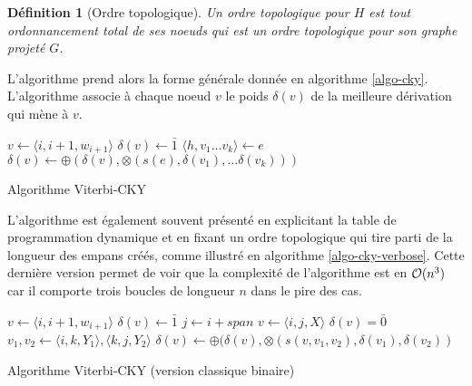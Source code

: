 \documentclass[11pt,openany]{book}
\newtheorem{definition}{Définition}[chapter]
\begin{document}
\begin{definition}[Ordre topologique]
Un ordre topologique pour $H$ est tout ordonnancement total de ses noeuds 
qui est un ordre topologique pour son graphe projeté $G$.
\end{definition}

L'algorithme prend alors la forme générale donnée en algorithme \ref{algo-cky}.
L'algorithme associe à chaque noeud $v$ le poids $\delta(v)$ de la meilleure dérivation qui mène à $v$.

\begin{algorithm}
\begin{algorithmic}[htbp]
\State $v \gets \langle i,i+1,w_{i+1} \rangle$
\State $\delta(v) \gets \bar{1}$
\EndFor
{}
\State $\langle h, v_1\ldots v_k\rangle \gets e$
\State $\delta(v) \gets \oplus (\delta(v) , \otimes(s(e),\delta(v_1) ,\ldots \delta (v_k)))$
\EndFor
\EndFor
\EndFunction
\end{algorithmic}
\caption{\label{algo-cky} Algorithme Viterbi-CKY}
\end{algorithm}

L'algorithme est également souvent présenté en explicitant la table de programmation dynamique et en fixant un ordre topologique 
qui tire parti de la longueur des empans créés, comme illustré en algorithme \ref{algo-cky-verbose}.
Cette dernière version permet de voir que la complexité de l'algorithme est en ${\cal O}(n^3)$ car il comporte trois boucles de longueur $n$
dans le pire des cas.

\begin{algorithm}[htbp]
\begin{algorithmic}
\State $v \gets \langle i,i+1,w_{i+1} \rangle$
\State $\delta(v) \gets \bar{1}$
\EndFor
{}
\State $j \gets i+span$
\State $v \gets \langle i,j,X \rangle$
\State $\delta(v) = \bar{0}$
\State $v_1,v_2 \gets \langle i,k,Y_1 \rangle,\langle k,j,Y_2 \rangle$
\State $\delta(v) \gets \oplus(\delta(v), \otimes(s(v,v_1,v_2),\delta(v_1),\delta(v_2))$
\EndFor
\EndFor
\EndFor
\EndFor
\EndFunction
\end{algorithmic}
\caption{\label{algo-cky-verbose} Algorithme Viterbi-CKY (version classique binaire)}
\end{algorithm}
\end{document}
